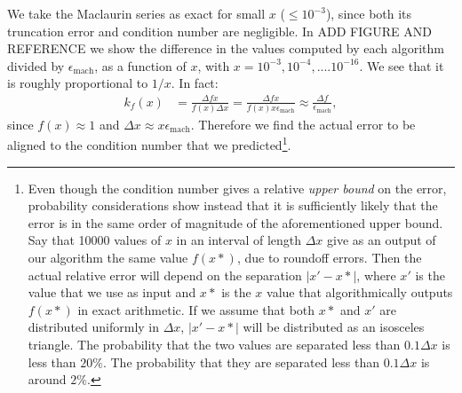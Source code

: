 \documentclass[a4paper,11]{article}
\newcommand{\emach}{\epsilon_{\text{mach}}}
\begin{document}
We take the Maclaurin series as exact for small $x$ ($\leq10^{-3}$), since
both its truncation error and condition number are negligible.
In ADD FIGURE AND REFERENCE we show the difference in the values 
computed by each algorithm divided by $\emach$, as a function of $x$, with
$x=10^{-3}, 10^{-4},....10^{-16}$. We see that it is roughly proportional to 
$1/x$. In fact:
\[
\begin{split}
	k_{f}(x)&=\frac{\Delta f x}{f(x) \Delta x}=
			 \frac{\Delta f x}{f(x) x\emach}\approx 
			\frac{\Delta f}{\emach},
\end{split}
\]
since $f(x)\approx 1$ and $\Delta x \approx x\emach$. Therefore we find the actual 
error to be aligned to the condition number that we predicted\footnote{
	Even though the condition number gives a relative \textit{upper bound} on
	the error, probability considerations show instead that it is 
	sufficiently likely
	that the error is in the same order of magnitude of the aforementioned
	upper bound. Say that 10000 values of $x$ in an interval 
	of length $\Delta x$ give as an output of our algorithm the same value 
	$f(x*)$, due to roundoff errors. Then the actual 
	relative error will depend on the separation $|x'-x*|$, where $x'$ is the
	value that we use as input and $x*$ is the $x$ value that algorithmically 
	outputs $f(x*)$ in exact arithmetic.
	If we assume that both $x*$ and $x'$ are distributed uniformly 
	in $\Delta x$, $|x'-x*|$ will be distributed as an isosceles triangle.
	The probability that the two values are separated less than $0.1\Delta x$
	is less than $20\%$. The probability that they are separated less than 
	$0.1\Delta x$ is around $2\%$.
}.

\end{document}
